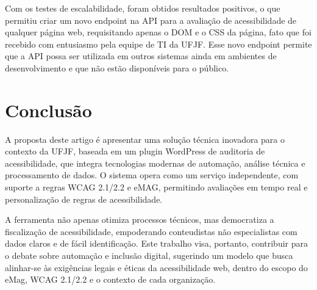\documentclass[
    12pt,
    a4paper,
    oneside,
    brazil,
    english
]{article}
\begin{document}
Com os testes de escalabilidade, foram obtidos resultados positivos, o que
permitiu criar um novo endpoint na API para a avaliação de acessibilidade
de qualquer página web, requisitando apenas o DOM e o CSS da página, fato que foi recebido
com entusiasmo pela equipe de TI da UFJF\@. Esse novo endpoint permite que
a API possa ser utilizada em outros sistemas ainda em ambientes de desenvolvimento
e que não estão disponíveis para o público.

\section*{Conclusão}
A proposta deste artigo é apresentar uma solução técnica inovadora para o
contexto da UFJF, baseada em um plugin WordPress de auditoria de acessibilidade,
que integra tecnologias modernas de automação, análise técnica e
processamento de dados. O sistema opera como um serviço independente, com
suporte a regras WCAG 2.1/2.2 e eMAG, permitindo avaliações em tempo real
e personalização de regras de acessibilidade.

A ferramenta não apenas otimiza processos técnicos, mas democratiza
a fiscalização de acessibilidade, empoderando conteudistas não especialistas
com dados claros e de fácil identificação. Este trabalho visa, portanto, contribuir
para o debate sobre automação e inclusão digital, sugerindo um modelo que busca alinhar-se às exigências legais e éticas da
acessibilidade web, dentro do escopo do eMag, WCAG 2.1/2.2 e o contexto de cada
organização.



\end{document}
